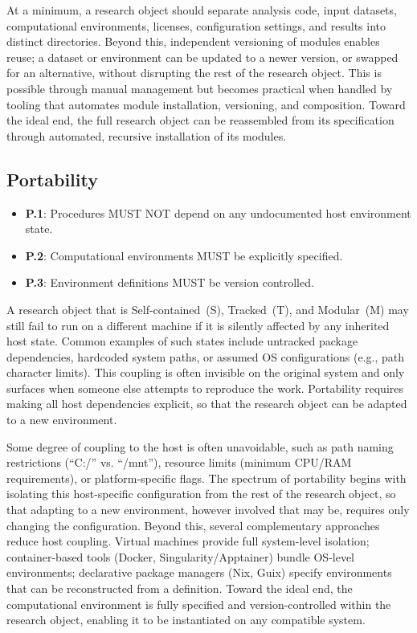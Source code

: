 \documentclass{article}
\makeatletter
\newcommand{\hyanchor}[1]{\texorpdfstring{\Hy@raisedlink{\hypertarget{#1}{}}}{}}
\newcommand{\anchoredsubsection}[2]{\subsection[#2]{\hyanchor{#1}#2}}
\makeatother
\begin{document}
At a minimum, a research object should separate analysis code, input datasets, computational environments, licenses, configuration settings, and results into distinct directories.
Beyond this, independent versioning of modules enables reuse; a dataset or environment can be updated to a newer version, or swapped for an alternative, without disrupting the rest of the research object.
This is possible through manual management but becomes practical when handled by tooling that automates module installation, versioning, and composition.
Toward the ideal end, the full research object can be reassembled from its specification through automated, recursive installation of its modules.



\anchoredsubsection{portability}{Portability}

\begin{itemize}
    \item \textbf{P.1}: Procedures MUST NOT depend on any undocumented host environment state.
    \item \textbf{P.2}: Computational environments MUST be explicitly specified.
    \item \textbf{P.3}: Environment definitions MUST be version controlled.
\end{itemize}

A research object that is Self-contained~(S), Tracked~(T), and Modular~(M) may still fail to run on a different machine if it is silently affected by any inherited host state.
Common examples of such states include untracked package dependencies, hardcoded system paths, or assumed OS configurations (e.g., path character limits).
This coupling is often invisible on the original system and only surfaces when someone else attempts to reproduce the work.
Portability requires making all host dependencies explicit, so that the research object can be adapted to a new environment.

Some degree of coupling to the host is often unavoidable, such as path naming restrictions (``C:/'' vs. ``/mnt''), resource limits (minimum CPU/RAM requirements), or platform-specific flags.
The spectrum of portability begins with isolating this host-specific configuration from the rest of the research object, so that adapting to a new environment, however involved that may be, requires only changing the configuration.
Beyond this, several complementary approaches reduce host coupling.
Virtual machines provide full system-level isolation; container-based tools (Docker, Singularity/Apptainer) bundle OS-level environments; declarative package managers (Nix\cite{kowalewski_sustainable_2022}, Guix\cite{courtes_reproducible_2015}) specify environments that can be reconstructed from a definition.
Toward the ideal end, the computational environment is fully specified and version-controlled within the research object, enabling it to be instantiated on any compatible system.
\end{document}
